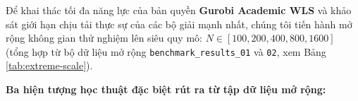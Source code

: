 \documentclass[a4paper,11pt]{article}
\begin{document}
Để khai thác tối đa năng lực của bản quyền \textbf{Gurobi Academic WLS} và khảo sát giới hạn chịu tải thực sự của các bộ giải mạnh nhất, chúng tôi tiến hành mở rộng không gian thử nghiệm lên siêu quy mô: $N \in [100, 200, 400, 800, 1600]$ (tổng hợp từ bộ dữ liệu mở rộng \texttt{benchmark\_results\_01} và \texttt{02}, xem Bảng \ref{tab:extreme-scale}).

\begin{table}[t]
\centering
\footnotesize
\setlength{\tabcolsep}{5pt}
\caption{Thử nghiệm áp lực siêu quy mô: Thời gian giải (giây) tại các kích thước $N \ge 100$}
\label{tab:extreme-scale}
\end{table}

\noindent \textbf{Ba hiện tượng học thuật đặc biệt rút ra từ tập dữ liệu mở rộng:}
\end{document}
